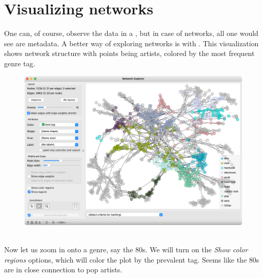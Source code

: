 \newpage

\section{Visualizing networks}

One can, of course, observe the data in a , but in case of networks, all one would see are metadata. A better way of exploring networks is with . This visualization shows network structure with points being artists, colored by the most frequent genre tag.

\vspace{-0.2cm}
\begin{figure}[h]
  \centering
  \includegraphics[width=\linewidth]{network.png}%
  \caption{$\;$}
\end{figure}
\vspace{-0.3cm}


Now let us zoom in onto a genre, say the 80s. We will turn on the \emph{Show color regions} options, which will color the plot by the prevalent tag. Seems like the 80s are in close connection to pop artists.

